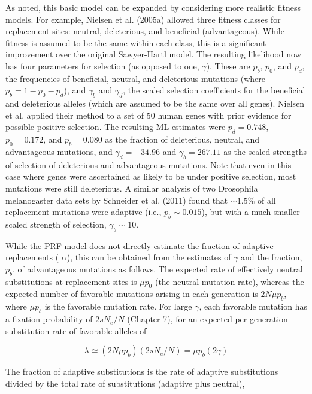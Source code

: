 \documentclass{article}
\begin{document}
As noted, this basic model can be expanded by considering more realistic fitness models. For example, Nielsen et al. (2005a) allowed three fitness classes for replacement sites: neutral, deleterious, and beneficial (advantageous). While fitness is assumed to be the same within each class, this is a significant improvement over the original Sawyer-Hartl model. The resulting likelihood now has four parameters for selection (as opposed to one,  $ \gamma $). These are  $ p_b $,  $ p_0 $, and  $ p_d $, the frequencies of beneficial, neutral, and deleterious mutations (where  $ p_b = 1 - p_0 - p_d $), and  $ \gamma_b $ and  $ \gamma_d $, the scaled selection coefficients for the beneficial and deleterious alleles (which are assumed to be the same over all genes). Nielsen et al. applied their method to a set of 50 human genes with prior evidence for possible positive selection. The resulting ML estimates were  $ p_d = 0.748 $,  $ p_0 = 0.172 $, and  $ p_b = 0.080 $ as the fraction of deleterious, neutral, and advantageous mutations, and  $ \gamma_d = -34.96 $ and  $ \gamma_b = 267.11 $ as the scaled strengths of selection of deleterious and advantageous mutations. Note that even in this case where genes were ascertained as likely to be under positive selection, most mutations were still deleterious. A similar analysis of two Drosophila melanogaster data sets by Schneider et al. (2011) found that  $ \sim 1.5\% $ of all replacement mutations were adaptive (i.e.,  $ p_b \sim 0.015 $), but with a much smaller scaled strength of selection,  $ \gamma_b \sim 10 $.

While the PRF model does not directly estimate the fraction of adaptive replacements ( $ \alpha $), this can be obtained from the estimates of  $ \gamma $ and the fraction,  $ p_b $, of advantageous mutations as follows. The expected rate of effectively neutral substitutions at replacement sites is  $ \mu p_0 $ (the neutral mutation rate), whereas the expected number of favorable mutations arising in each generation is  $ 2N\mu p_b $, where  $ \mu p_b $ is the favorable mutation rate. For large  $ \gamma $, each favorable mutation has a fixation probability of  $ 2sN_e/N $ (Chapter 7), for an expected per-generation substitution rate of favorable alleles of

\begin{equation}
\lambda\simeq(2N\mu p_{b})(2s N_{e}/N)=\mu p_{b}(2\gamma)
\tag{10.16a}
\label{eq:10_16a}
\end{equation}

The fraction of adaptive substitutions is the rate of adaptive substitutions divided by the total rate of substitutions (adaptive plus neutral),
\end{document}
